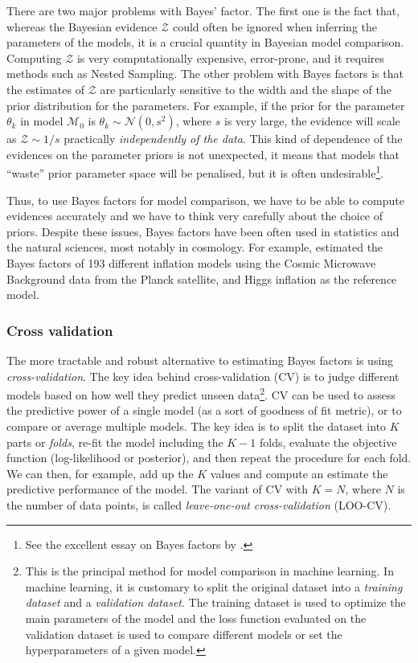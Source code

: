 \documentclass[12pt,dvipsnames]{report}
\begin{document}
There are two major problems with Bayes' factor. The first one is the fact that,
whereas the Bayesian evidence $\mathcal{Z}$ could often be ignored when inferring the 
parameters of the models, it is a crucial quantity in Bayesian model comparison. 
Computing $\mathcal{Z}$ is very computationally expensive, error-prone, and it
 requires methods such as Nested Sampling.
The other problem with Bayes
factors is that the estimates of $\mathcal{Z}$ are particularly sensitive to the 
width and the shape of the prior distribution for the parameters. For example, if 
the prior for the parameter $\theta_k$
in model $\mathcal{M}_0$ is $\theta_k\sim \mathcal{N}(0, s^2)$, where $s$ is
very large, the evidence will scale as $\mathcal{Z}\sim 1/s$ practically
\emph{independently of the data}. This kind of dependence of the evidences on the
parameter priors is not unexpected, it means that models that ``waste'' prior
parameter space will be penalised, but it is often undesirable\footnote{See the 
excellent essay on Bayes factors by \citet{navarro_2020}.}. 

Thus, to use Bayes factors for model comparison, we have to be able to
compute evidences accurately and we have to think very carefully about the choice of 
priors. Despite
these issues, Bayes factors have been often used in statistics and the 
natural sciences, most notably in cosmology. For example, \citet{arXiv:1312.3529} 
estimated the Bayes factors of 193 different 
inflation models using the Cosmic Microwave Background
data from the Planck satellite, and Higgs inflation as the reference model. 

\subsubsection{Cross validation}
The more tractable and robust alternative to estimating Bayes factors is using 
\emph{cross-validation}. The key idea behind cross-validation (CV) is to judge 
different models based on how well they predict unseen data\footnote{This is 
the principal method for model comparison in machine learning. In machine learning, 
it is customary to split the original dataset into a \emph{training dataset} 
and a \emph{validation dataset}. The training dataset is used to optimize 
the main parameters of the model and the loss function evaluated on the 
validation dataset is used to compare different models or set the hyperparameters
of a given model.}. 
CV can be used to assess the predictive power of a single model (as a sort of 
goodness of fit metric), or to compare or average multiple models. 
The key idea is to split the dataset into $K$ parts or \emph{folds}, 
re-fit the model including the $K-1$ folds, evaluate the objective function 
(log-likelihood or posterior), and then repeat the procedure for each fold. We 
can then, for example, add up the $K$ values and compute an estimate 
the predictive performance of the model. 
The variant of CV with $K=N$, where $N$ is the number of data points, is called
\emph{leave-one-out cross-validation} (LOO-CV).
\end{document}
